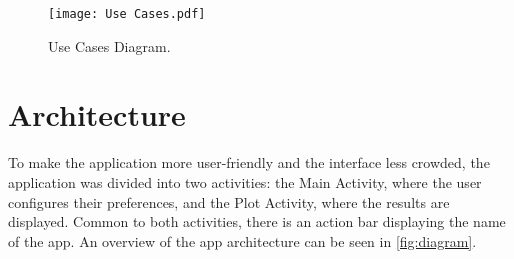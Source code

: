 \documentclass{article}
\begin{document}
\begin{figure}[ht]
    \centering
    \texttt{[image: Use Cases.pdf]}
    \caption{Use Cases Diagram.}
    \label{fig:UseCases}
\end{figure}


\clearpage
\section{Architecture}
To make the application more user-friendly and the interface less crowded, the application was divided into two activities: the Main Activity, where the user configures their preferences, and the Plot Activity, where the results are displayed.
Common to both activities, there is an action bar displaying the name of the app. 
An overview of the app architecture can be seen in \autoref{fig:diagram}.
\end{document}

